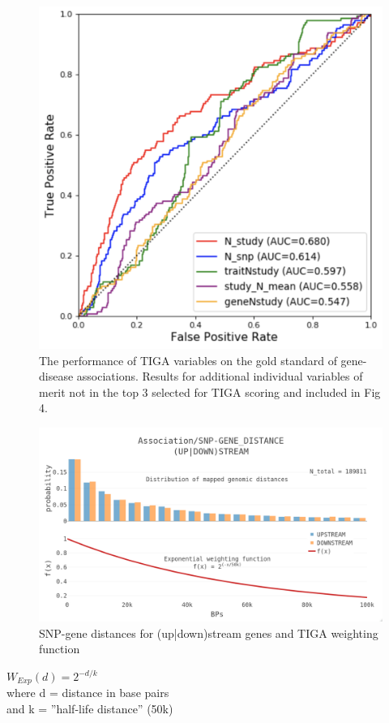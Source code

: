 \begin{figure}
	\includegraphics[width=\textwidth]{figures/tiga/SupFIG01_AdditionalROCs.png}
	\caption{The performance of TIGA variables on the gold standard of gene-disease associations. Results for additional individual variables of merit not in the top 3 selected for TIGA scoring and included in Fig 4.}
	\label{fig:TIGA_Sup01}
\end{figure}


\begin{figure}
	\includegraphics[width=\textwidth]{figures/tiga/SupFIG02_distance_weighting_function.jpg}
	\caption{SNP-gene distances for (up|down)stream genes and TIGA weighting function}
	\label{fig:TIGA_Sup02}
\end{figure}


\begin{center}
$W_{Exp}(d) = 2^{-d/k}$ \\
where d = distance in base pairs \\ 
and k = ”half-life distance” (50k) \\
\end{center}

